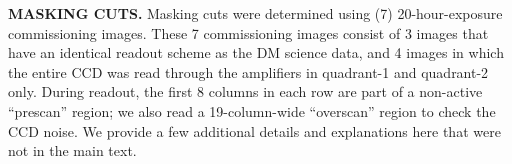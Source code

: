 \documentclass[aps,prl,twocolumn,showpacs,superscriptaddress,preprintnumbers]{revtex4-1}
\begin{document}
%
\noindent\textbf{MASKING CUTS.}
Masking cuts were determined using (7) 20-hour-exposure commissioning images. These 7 commissioning images consist of 3 images that have an identical readout scheme as the DM science data, and 4 images in which the entire CCD was read through the amplifiers in quadrant-1 and quadrant-2 only. 
During readout, the first 8 columns in each row are part of a non-active ``prescan'' region; we also read a 19-column-wide ``overscan'' region to check the CCD noise. 
We provide a few additional details and explanations here that were not in the main text. 
\end{document}
